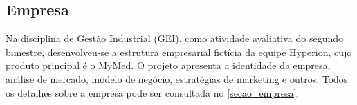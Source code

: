 \documentclass[
	article,			%
	12pt,				%
	oneside,			%
	a4paper,			%
    BIBLATEX,           %
	english,			%
	brazil,				%
	sumario=tradicional
	]{abntex2}
\newcommand\nomeprojeto{MyMed}
\begin{document}
\subsection{Empresa}
Na disciplina de Gestão Industrial (GEI), como atividade avaliativa do segundo bimestre, desenvolveu-se a estrutura empresarial fictícia da equipe Hyperion, cujo produto principal é o \nomeprojeto. O projeto apresenta a identidade da empresa, análise de mercado, modelo de negócio, estratégias de marketing e outros. Todos os detalhes sobre a empresa pode ser consultada no \autoref{secao_empresa}.

\postextual


%
%

\newpage
\end{document}
